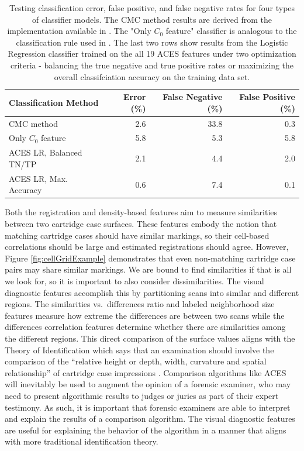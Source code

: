 \documentclass[11pt,]{isuthesis}
\begin{document}
\begin{table}[htbp]
\centering
\begin{tabular}{l r r r}
Classification Method & Error (\%) & False Negative (\%) & False Positive (\%) \\
\hline
CMC method & 2.6 & 33.8  & 0.3 \\
Only $C_0$ feature & 5.8 & 5.3  & 5.8\\
ACES LR, Balanced TN/TP & 2.1 & 4.4  & 2.0 \\
ACES LR, Max. Accuracy & 0.6 & 7.4 & 0.1
\end{tabular}
\caption{Testing classification error, false positive, and false negative rates for four types of classifier models. The CMC method results are derived from the implementation available in \protect\citet{cmcR}. The "Only $C_0$ feature" classifier is analogous to the classification rule used in \protect\citet{Zhang2020}. The last two rows show results from the Logistic Regression classifier trained on the all 19 ACES features under two optimization criteria - balancing the true negative and true positive rates or maximizing the overall classifciation accuracy on the training data set.}
\label{tab:classifMethodComparison}
\end{table}

Both the registration and density-based features aim to measure similarities between two cartridge case surfaces.
These features embody the notion that matching cartridge cases should have similar markings, so their cell-based correlations should be large and estimated registrations should agree.
However, Figure \ref{fig:cellGridExample} demonstrates that even non-matching cartridge case pairs may share similar markings.
We are bound to find similarities if that is all we look for, so it is important to also consider dissimilarities.
The visual diagnostic features accomplish this by partitioning scans into similar and different regions.
The similarities vs.~differences ratio and labeled neighborhood size features measure how extreme the differences are between two scans while the differences correlation features determine whether there are similarities among the different regions.
This direct comparison of the surface values aligns with the Theory of Identification which says that an examination should involve the comparison of the ``relative height or depth, width, curvature and spatial relationship'' of cartridge case impressions \citep{AFTE1992}.
Comparison algorithms like ACES will inevitably be used to augment the opinion of a forensic examiner, who may need to present algorithmic results to judges or juries as part of their expert testimony.
As such, it is important that forensic examiners are able to interpret and explain the results of a comparison algorithm.
The visual diagnostic features are useful for explaining the behavior of the algorithm in a manner that aligns with more traditional identification theory.
\end{document}
